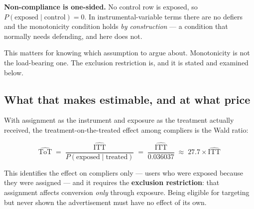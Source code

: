 \documentclass[11pt,a4paper]{article}
\begin{document}
\textbf{Non-compliance is one-sided.} No control row is exposed, so $P(\text{exposed} \mid
\text{control}) = 0$. In instrumental-variable terms there are no defiers and the monotonicity
condition holds \emph{by construction} --- a condition that normally needs defending, and here
does not.

This matters for knowing which assumption to argue about. Monotonicity is not the load-bearing one.
The exclusion restriction is, and it is stated and examined below.

\subsection{What that makes estimable, and at what price}

With assignment as the instrument and exposure as the treatment actually received, the
treatment-on-the-treated effect among compliers is the Wald ratio:

\[
\widehat{\text{ToT}} \;=\; \frac{\widehat{\text{ITT}}}{P(\text{exposed} \mid \text{treated})}
\;=\; \frac{\widehat{\text{ITT}}}{0.036037} \;\approx\; 27.7 \times \widehat{\text{ITT}}
\]

This identifies the effect on compliers only --- users who were exposed because they were assigned
--- and it requires the \textbf{exclusion restriction}: that assignment affects conversion
\emph{only} through exposure. Being eligible for targeting but never shown the advertisement must
have no effect of its own.
\end{document}
